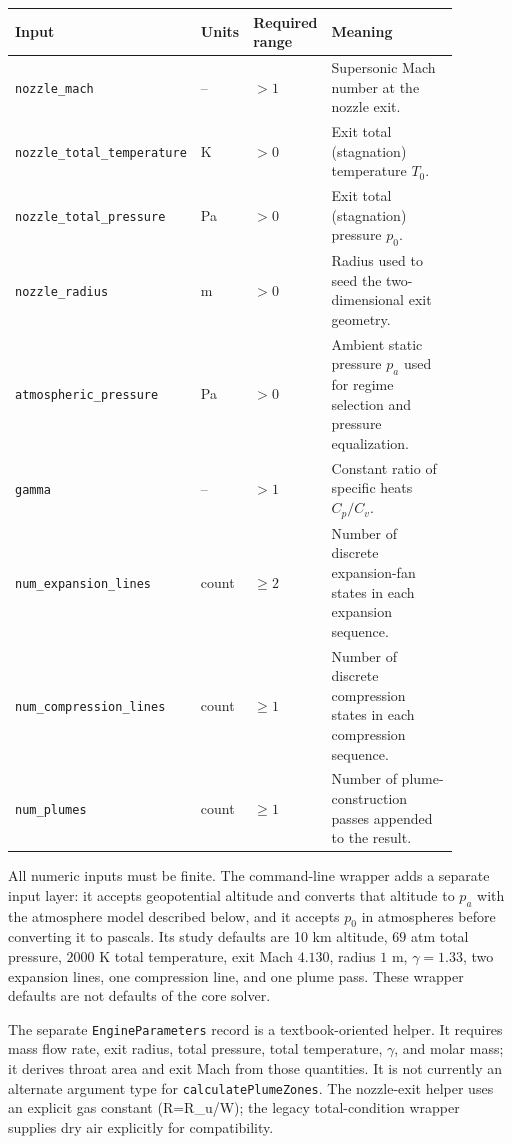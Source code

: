 \documentclass[11pt]{article}
\begin{document}
\begin{longtable}{p{0.30\linewidth}p{0.10\linewidth}p{0.14\linewidth}p{0.34\linewidth}}
\hline
Input & Units & Required range & Meaning \\
\hline
\texttt{nozzle\_mach} & -- & \(>1\) & Supersonic Mach number at the nozzle exit. \\
\texttt{nozzle\_total\_temperature} & K & \(>0\) & Exit total (stagnation) temperature \(T_0\). \\
\texttt{nozzle\_total\_pressure} & Pa & \(>0\) & Exit total (stagnation) pressure \(p_0\). \\
\texttt{nozzle\_radius} & m & \(>0\) & Radius used to seed the two-dimensional exit geometry. \\
\texttt{atmospheric\_pressure} & Pa & \(>0\) & Ambient static pressure \(p_a\) used for regime selection and pressure equalization. \\
\texttt{gamma} & -- & \(>1\) & Constant ratio of specific heats \(C_p/C_v\). \\
\texttt{num\_expansion\_lines} & count & \(\geq 2\) & Number of discrete expansion-fan states in each expansion sequence. \\
\texttt{num\_compression\_lines} & count & \(\geq 1\) & Number of discrete compression states in each compression sequence. \\
\texttt{num\_plumes} & count & \(\geq 1\) & Number of plume-construction passes appended to the result. \\
\hline
\end{longtable}

All numeric inputs must be finite.  The command-line wrapper adds a separate
input layer: it accepts geopotential altitude and converts that altitude to
\(p_a\) with the atmosphere model described below, and it accepts \(p_0\) in
atmospheres before converting it to pascals.  Its study defaults are 10 km
altitude, \(69\) atm total pressure, \(2000\) K total temperature, exit Mach
\(4.130\), radius \(1\) m, \(\gamma=1.33\), two expansion lines, one
compression line, and one plume pass.  These wrapper defaults are not defaults
of the core solver.

The separate \texttt{EngineParameters} record is a textbook-oriented helper.
It requires mass flow rate, exit radius, total pressure, total temperature,
\(\gamma\), and molar mass; it derives throat area and exit Mach from those
quantities.  It is not currently an alternate argument type for
\texttt{calculatePlumeZones}.  The nozzle-exit helper uses an explicit gas
constant (R=R_u/W); the legacy total-condition wrapper supplies dry air
explicitly for compatibility.
\end{document}

